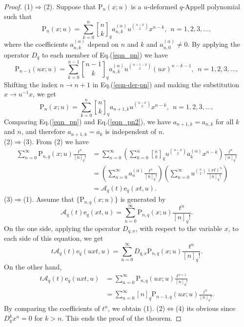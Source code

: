 \documentclass[10pt,a4paper]{amsart}
\newcommand{\A}{\mathcal{A}}
\newcommand{\e}{\mathrm{e}}
\newcommand{\p}{\mathrm{P}}
\newcommand{\qbinom}{\genfrac{[}{]}{0pt}{}}
\begin{document}
\begin{proof}
(1)$\Rightarrow$(2). Suppose that $\p_{n}(x;u)$ is a $u$-deformed $q$-Appell polynomial such that
\begin{equation}\label{eqn_pn}
    \p_{n}(x;u)=\sum_{k=0}^{n}\qbinom{n}{k}_{q}a^{(\alpha)}_{n,k}u^{\binom{n-k}{2}}x^{n-k},\ \ n=1,2,3,\ldots,
\end{equation}
where the coefficients $a^{(\alpha)}_{n,k}$ depend on $n$ and $k$ and $a_{n,0}^{(\alpha)}\neq0$. By applying the operator $D_{q}$ to each member of Eq.(\ref{eqn_pn}) we have
\begin{equation}\label{eqn-der-pn}
    \p_{n-1}(ux;u)=\sum_{k=0}^{n-1}\qbinom{n-1}{k}_{q}a^{(\alpha)}_{n,k}u^{\binom{n-1-k}{2}}(ux)^{n-k-1},\ \ n=1,2,3,\ldots,
\end{equation}
Shifting the index $n\rightarrow n+1$ in Eq.(\ref{eqn-der-pn}) and making the substitution $x\rightarrow u^{-1}x$, we get
\begin{equation}\label{eqn_pn2}
    \p_{n}(x;u)=\sum_{k=0}^{n}\qbinom{n}{k}_{q}a_{n+1,k}u^{\binom{n-k}{2}}x^{n-k},\ \ n=1,2,3,\ldots,
\end{equation}
Comparing Eq.(\ref{eqn_pn}) and Eq.(\ref{eqn_pn2}), we have $a_{n+1,k}=a_{n,k}$ for all $k$ and $n$, and therefore $a_{n+1,k}=a_{k}$ is independent of $n$. \\
(2)$\Rightarrow$(3). From (2) we have
\begin{align*}
    \sum_{n=0}^{\infty}\p_{n,q}(x;u)\frac{t^n}{[n]_{q}!}&=\sum_{n=0}^{\infty}\left(\sum_{k=0}^{n}\qbinom{n}{k}_{q}u^{\binom{n-k}{2}}a_{k}^{(\alpha)}x^{n-k}\right)\frac{t^n}{[n]_{q}!}\\
    &=\left(\sum_{n=0}^{\infty}a_{n}^{(\alpha)}\frac{t^n}{[n]_{q}!}\right)\left(\sum_{n=0}^{\infty}u^{\binom{n}{2}}\frac{(xt)^n}{[n]_{q}!}\right)\\
    &=\A_{q}(t)\e_{q}(xt,u).
\end{align*}
(3)$\Rightarrow$(1). Assume that $\{\p_{n,q}(x;u)\}$ is generated by
\begin{equation*}
    \A_{q}(t)\e_{q}(xt,u)=\sum_{n=0}^{\infty}\p_{n,q}(x;u)\frac{t^n}{[n]_{q}!}.
\end{equation*}
On the one side, applying the operator $D_{q,x}$, with respect to the variable $x$, to each side of this equation, we get
\begin{equation*}
    t\A_{q}(t)\e_{q}(uxt,u)=\sum_{n=0}^{\infty}D_{q,x}\p_{n,q}(x;u)\frac{t^{n}}{[n]_{q}!}.
\end{equation*}
On the other hand, 
\begin{align*}
    t\A_{q}(t)\e_{q}(uxt,u)&=\sum_{n=0}^{\infty}\p_{n,q}(ux;u)\frac{t^{n+1}}{[n]_{q}!}\\
    &=\sum_{n=0}^{\infty}[n]_{q}\p_{n-1,q}(ux;u)\frac{t^{n}}{[n]_{q}!}.
\end{align*}
By comparing the coefficients of $t^n$, we obtain (1). (2)$\Longleftrightarrow$(4) its obvious since $D_{q}^{k}x^{n}=0$ for $k>n$. This ends the proof of the theorem.
\end{proof}
\end{document}
